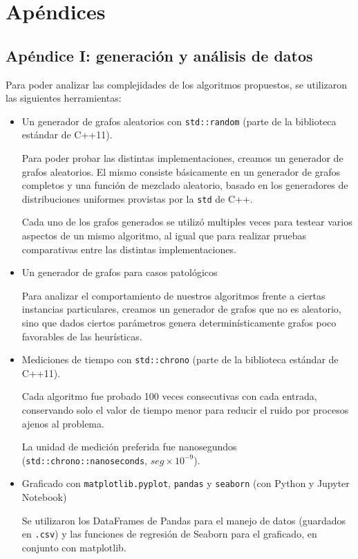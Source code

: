 \section{Apéndices}
	\subsection{Apéndice I: generación y análisis de datos}

	Para poder analizar las complejidades de los algoritmos propuestos, se utilizaron las siguientes herramientas:

	\begin{itemize}
		\item Un generador de grafos aleatorios con \texttt{std::random} (parte de la biblioteca estándar de C++11).

		Para poder probar las distintas implementaciones, creamos un generador de grafos aleatorios. El mismo consiste básicamente en un generador de grafos completos y una función de mezclado aleatorio, basado en los generadores de distribuciones uniformes provistas por la \texttt{std} de C++.

		Cada uno de los grafos generados se utilizó multiples veces para testear varios aspectos de un mismo algoritmo, al igual que para realizar pruebas comparativas entre las distintas implementaciones.

		\item Un generador de grafos para casos patológicos

		Para analizar el comportamiento de nuestros algoritmos frente a ciertas instancias particulares, creamos un generador de grafos que no es aleatorio, sino que dados ciertos parámetros genera determinísticamente grafos poco favorables de las heurísticas.

		\item Mediciones de tiempo con \texttt{std::chrono} (parte de la biblioteca estándar de C++11).

		Cada algoritmo fue probado 100 veces consecutivas con cada entrada, conservando solo el valor de tiempo menor para reducir el ruido por procesos ajenos al problema.

		La unidad de medición preferida fue nanosegundos (\texttt{std::chrono::nanoseconds}, $seg \times 10^{-9}$).

		\item Graficado con \texttt{matplotlib.pyplot}, \texttt{pandas} y \texttt{seaborn} (con Python y Jupyter Notebook)

		Se utilizaron los DataFrames de Pandas para el manejo de datos (guardados en \texttt{.csv}) y las funciones de regresión de Seaborn para el graficado, en conjunto con matplotlib.

	\end{itemize}

